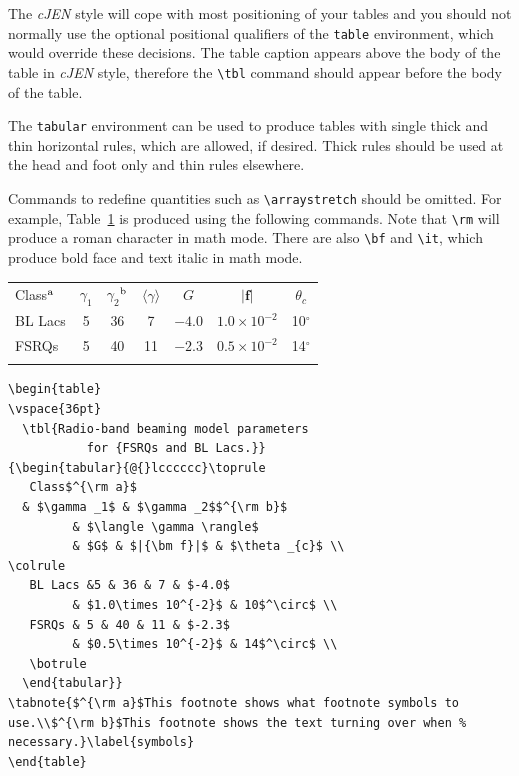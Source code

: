 \documentclass[]{cJEN2e}
\begin{document}
The {\it cJEN} style will cope with most positioning of your tables and you should not normally use the optional
positional qualifiers of the {\tt table} environment, which would override these decisions. The table caption
appears above the body of the table in {\it cJEN} style, therefore the \verb"\tbl" command should appear before
the body of the table.

The {\tt tabular} environment can be used to produce tables with single thick and thin horizontal rules, which
are allowed, if desired. Thick rules should be used at the head and foot only and thin rules elsewhere.

Commands to redefine quantities such as \verb"\arraystretch" should be omitted. For example, Table~\ref{symbols}
is produced using the following commands. Note that \verb"\rm" will produce a roman character in math mode. There
are also \verb"\bf" and \verb"\it", which produce bold face and text italic in math mode.

\begin{table}
\vspace{36pt}
{\begin{tabular}[l]{@{}lcccccc}\toprule
   Class$^{\rm a}$
  & $\gamma _1$ & $\gamma _2$$^{\rm b}$
         & $\langle \gamma \rangle$
         & $G$ & $|{\bm f}|$ & $\theta _{c}$ \\
\colrule
   BL Lacs &5 & 36 & 7 & $-4.0$
         & $1.0\times 10^{-2}$ & 10$^\circ$ \\
   FSRQs & 5 & 40 & 11 & $-2.3$
         & $0.5\times 10^{-2}$ & 14$^\circ$ \\
   \botrule
  \end{tabular}}
\label{symbols}
\end{table}


\begin{verbatim}
\begin{table}
\vspace{36pt}
  \tbl{Radio-band beaming model parameters
           for {FSRQs and BL Lacs.}}
{\begin{tabular}{@{}lcccccc}\toprule
   Class$^{\rm a}$
  & $\gamma _1$ & $\gamma _2$$^{\rm b}$
         & $\langle \gamma \rangle$
         & $G$ & $|{\bm f}|$ & $\theta _{c}$ \\
\colrule
   BL Lacs &5 & 36 & 7 & $-4.0$
         & $1.0\times 10^{-2}$ & 10$^\circ$ \\
   FSRQs & 5 & 40 & 11 & $-2.3$
         & $0.5\times 10^{-2}$ & 14$^\circ$ \\
   \botrule
  \end{tabular}}
\tabnote{$^{\rm a}$This footnote shows what footnote symbols to
use.\\$^{\rm b}$This footnote shows the text turning over when %
necessary.}\label{symbols}
\end{table}
\end{verbatim}
\end{document}
